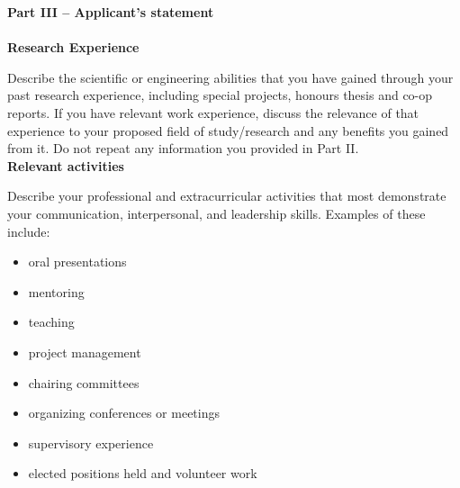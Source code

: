 \documentclass[12pt]{article}
\begin{document}
\vspace{0.2in}\noindent\textbf{Part III – Applicant's statement}\\\\
\textbf{Research Experience}

\vspace{0.1in}\noindent Describe the scientific or engineering abilities that you have gained through your past research experience, including special projects, honours thesis and co-op reports. If you have relevant work experience, discuss the relevance of that experience to your proposed field of study/research and any benefits you gained from it. Do not repeat any information you provided in Part II. \\

\noindent\textbf{Relevant activities}

\vspace{0.1in}\noindent Describe your professional and extracurricular activities that most demonstrate your communication, interpersonal, and leadership skills. Examples of these include: 
\begin{itemize}[noitemsep]
\item oral presentations
\item mentoring
\item teaching
\item project management
\item chairing committees
\item organizing conferences or meetings
\item supervisory experience
\item elected positions held and volunteer work 
\end{itemize}
\end{document}
